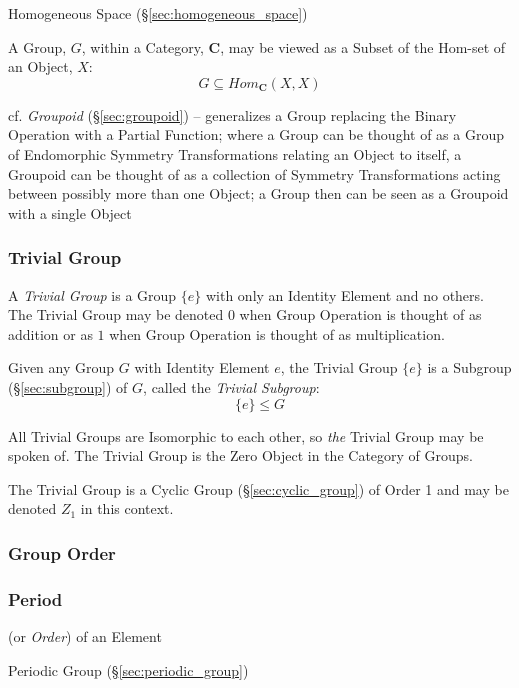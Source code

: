 \fist Homogeneous Space (\S\ref{sec:homogeneous_space})

A Group, $G$, within a Category, $\mathbf{C}$, may be viewed as a Subset of the
Hom-set of an Object, $X$:
\[
    G \subseteq Hom_{\mathbf{C}}(X,X)
\]

\fist cf. \emph{Groupoid} (\S\ref{sec:groupoid}) -- generalizes a Group
replacing the Binary Operation with a Partial Function; where a Group can be
thought of as a Group of Endomorphic Symmetry Transformations relating an Object
to itself, a Groupoid can be thought of as a collection of Symmetry
Transformations acting between possibly more than one Object; a Group then can
be seen as a Groupoid with a single Object



\subsubsection{Trivial Group}\label{sec:trivial_group}

A \emph{Trivial Group} is a Group $\{e\}$ with only an Identity
Element and no others. The Trivial Group may be denoted $0$ when
Group Operation is thought of as addition or as $1$ when Group
Operation is thought of as multiplication.

Given any Group $G$ with Identity Element $e$, the Trivial Group
$\{e\}$ is a Subgroup (\S\ref{sec:subgroup}) of $G$, called the
\emph{Trivial Subgroup}:
\[
    \{e\} \leq G
\]

All Trivial Groups are Isomorphic to each other, so \emph{the} Trivial
Group may be spoken of. The Trivial Group is the Zero Object in the
Category of Groups.

The Trivial Group is a Cyclic Group (\S\ref{sec:cyclic_group}) of
Order 1 and may be denoted $Z_1$ in this context.



\subsubsection{Group Order}\label{sec:group_order}

\subsubsection{Period}\label{sec:period}

(or \emph{Order}) of an Element

Periodic Group (\S\ref{sec:periodic_group})



